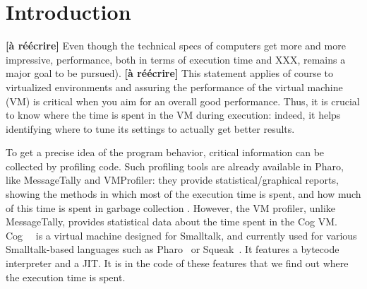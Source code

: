 \documentclass[10pt,preprint,nonatbib]{sigplanconf}
\newcommand{\ct}{\lstinline[backgroundcolor=\color{white},basicstyle=\small\ttfamily]}
\begin{document}






\section{Introduction}

%
%
%
%
%
%



\textbf{[\`a r\'e\'ecrire]} Even though the technical specs of computers get more and more impressive, performance, both in terms of execution time and XXX, remains a major goal to be pursued). \textbf{[\`a r\'e\'ecrire]}
This statement applies of course to virtualized environments and assuring the performance of the virtual machine (VM) is critical when you aim for an overall good performance. 
Thus, it is crucial to know where the time is spent in the VM during execution: indeed, it helps identifying where to tune its settings to actually get better results.

To get a precise idea of the program behavior, critical information can be collected by profiling code.
Such profiling tools are already available in Pharo, like MessageTally \cite{Berg13a} and VMProfiler: they provide statistical/graphical reports, showing the methods in which most of the execution time is spent, and how much of this time is spent in garbage collection \cite{Berg13a}. However, the VM profiler, unlike MessageTally, provides statistical data about the time spent in the Cog VM. Cog~\cite{Mira08a}~ is a virtual machine designed for Smalltalk, and currently used for various Smalltalk-based languages such as Pharo~\cite{Blac09a} or Squeak~\cite{Blac07a}. It features a bytecode interpreter and a JIT. It is in the code of these features that we find out where the execution time is spent.\\
\end{document}
